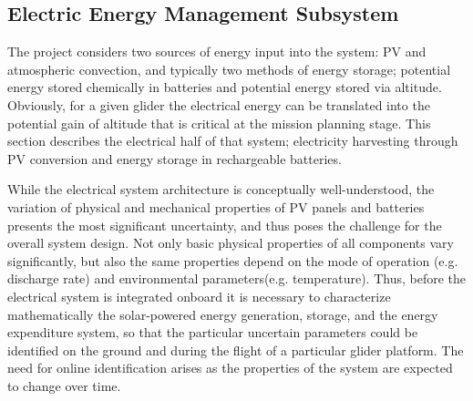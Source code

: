 \documentclass{ifacconf}
\newcommand{\squeezeup}{\vspace{-3.0mm}}
\begin{document}
\subsection{Electric Energy Management Subsystem}
\label{subsec:Electric}
\squeezeup

The project considers two sources of energy input into the system: PV and
atmospheric convection, and typically two methods of energy storage;
potential energy stored chemically in batteries and potential energy stored
via altitude. Obviously, for a given glider the electrical energy can be
translated into the potential gain of altitude that is critical at the
mission planning stage. This section describes the electrical half of that
system; electricity harvesting through PV conversion and energy storage in
rechargeable batteries.

While the electrical system architecture is conceptually well-understood, the
variation of physical and mechanical properties of PV panels and batteries
presents the most significant uncertainty, and thus poses the challenge for
the overall system design. Not only basic physical properties of all
components vary significantly, but also the same properties depend on the
mode of operation (e.g. discharge rate) and environmental parameters(e.g.
temperature). Thus, before the electrical system is integrated onboard it is
necessary to characterize mathematically the solar-powered energy generation,
storage, and the energy expenditure system, so that the particular uncertain
parameters could be identified on the ground and during the flight of a
particular glider platform. The need for online identification arises as the
properties of the system are expected to change over time.
\end{document}
